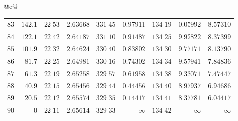\begin{center}
{\begin{tabular}{@{}c@{}}
\begin{tabular}{r|r|r|r|r|r|r|r|r}
$83$&$142.1$&$22\;53$&$2.63668$&$331\;45$&$0.97911$&$134\;19$&$0.05992$&$8.57310$\\
$84$&$122.1$&$22\;42$&$2.64187$&$331\;10$&$0.91487$&$134\;25$&$9.92822$&$8.37399$\\[2pt]
$85$&$101.9$&$22\;32$&$2.64624$&$330\;40$&$0.83802$&$134\;30$&$9.77171$&$8.13790$\\
$86$&$81.7$&$22\;25$&$2.64981$&$330\;16$&$0.74302$&$134\;34$&$9.57941$&$7.84836$\\
$87$&$61.3$&$22\;19$&$2.65258$&$329\;57$&$0.61958$&$134\;38$&$9.33071$&$7.47447$\\
$88$&$40.9$&$22\;15$&$2.65456$&$329\;44$&$0.44456$&$134\;40$&$8.97937$&$6.94686$\\
$89$&$20.5$&$22\;12$&$2.65574$&$329\;35$&$0.14417$&$134\;41$&$8.37781$&$6.04417$\\[2pt]
$90$&$0$&$22\;11$&$2.65614$&$329\;33$&$-\infty$&$134\;42$&$-\infty$&$-\infty$\\
\end{tabular}
\end{tabular}%
}
\end{center}
\endgroup
